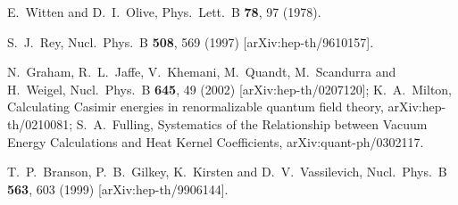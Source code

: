 \documentclass[a4paper,12pt]{article}
\begin{document}
\begin{thebibliography}{99}
E.~Witten and D.~I.~Olive,
Phys.\ Lett.\ B {\bf 78}, 97 (1978).

S.~J.~Rey,
Nucl.\ Phys.\ B {\bf 508}, 569 (1997)
[arXiv:hep-th/9610157].

N.~Graham, R.~L.~Jaffe, V.~Khemani, M.~Quandt, M.~Scandurra and H.~Weigel,
Nucl.\ Phys.\ B {\bf 645}, 49 (2002)
[arXiv:hep-th/0207120];
K.~A.~Milton,
Calculating Casimir energies in renormalizable quantum field theory,
arXiv:hep-th/0210081;
S.~A.~Fulling,
Systematics of the Relationship between Vacuum Energy 
Calculations and Heat Kernel Coefficients,
arXiv:quant-ph/0302117.

T.~P.~Branson, P.~B.~Gilkey, K.~Kirsten and D.~V.~Vassilevich,
Nucl.\ Phys.\ B {\bf 563}, 603 (1999)
[arXiv:hep-th/9906144].
\end{thebibliography}
\end{document}
